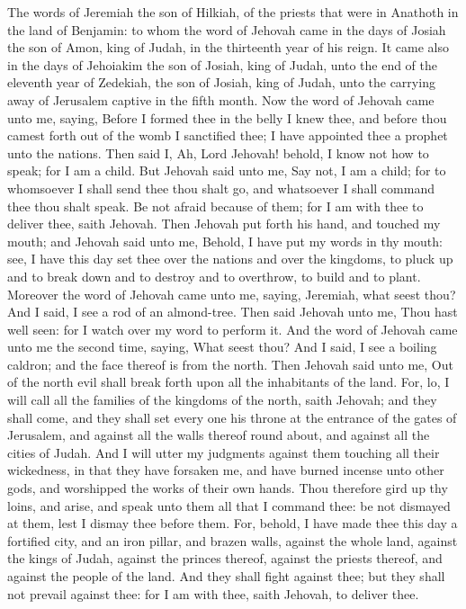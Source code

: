 


The words of Jeremiah the son of Hilkiah, of the priests that were in Anathoth in the land of Benjamin: to whom the word of Jehovah came in the days of Josiah the son of Amon, king of Judah, in the thirteenth year of his reign. It came also in the days of Jehoiakim the son of Josiah, king of Judah, unto the end of the eleventh year of Zedekiah, the son of Josiah, king of Judah, unto the carrying away of Jerusalem captive in the fifth month.  Now the word of Jehovah came unto me, saying, Before I formed thee in the belly I knew thee, and before thou camest forth out of the womb I sanctified thee; I have appointed thee a prophet unto the nations. Then said I, Ah, Lord Jehovah! behold, I know not how to speak; for I am a child. But Jehovah said unto me, Say not, I am a child; for to whomsoever I shall send thee thou shalt go, and whatsoever I shall command thee thou shalt speak. Be not afraid because of them; for I am with thee to deliver thee, saith Jehovah. Then Jehovah put forth his hand, and touched my mouth; and Jehovah said unto me, Behold, I have put my words in thy mouth: see, I have this day set thee over the nations and over the kingdoms, to pluck up and to break down and to destroy and to overthrow, to build and to plant.  Moreover the word of Jehovah came unto me, saying, Jeremiah, what seest thou? And I said, I see a rod of an almond-tree. Then said Jehovah unto me, Thou hast well seen: for I watch over my word to perform it.  And the word of Jehovah came unto me the second time, saying, What seest thou? And I said, I see a boiling caldron; and the face thereof is from the north. Then Jehovah said unto me, Out of the north evil shall break forth upon all the inhabitants of the land. For, lo, I will call all the families of the kingdoms of the north, saith Jehovah; and they shall come, and they shall set every one his throne at the entrance of the gates of Jerusalem, and against all the walls thereof round about, and against all the cities of Judah. And I will utter my judgments against them touching all their wickedness, in that they have forsaken me, and have burned incense unto other gods, and worshipped the works of their own hands. Thou therefore gird up thy loins, and arise, and speak unto them all that I command thee: be not dismayed at them, lest I dismay thee before them. For, behold, I have made thee this day a fortified city, and an iron pillar, and brazen walls, against the whole land, against the kings of Judah, against the princes thereof, against the priests thereof, and against the people of the land. And they shall fight against thee; but they shall not prevail against thee: for I am with thee, saith Jehovah, to deliver thee. 

